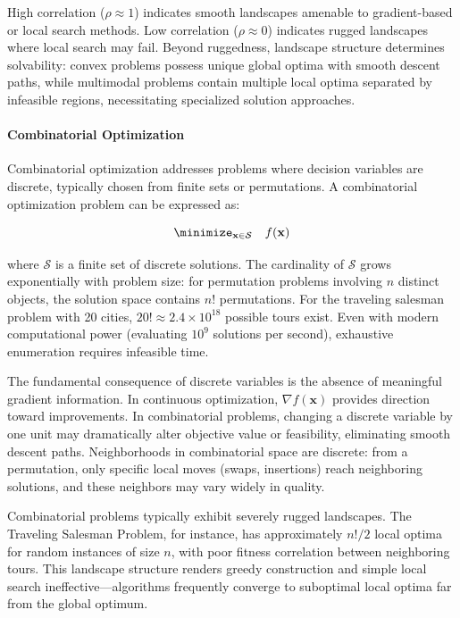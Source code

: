 High correlation ($\rho \approx 1$) indicates smooth landscapes amenable to gradient-based or local search methods. Low correlation ($\rho \approx 0$) indicates rugged landscapes where local search may fail. Beyond ruggedness, landscape structure determines solvability: convex problems possess unique global optima with smooth descent paths, while multimodal problems contain multiple local optima separated by infeasible regions, necessitating specialized solution approaches.

\paragraph{Combinatorial Optimization}

Combinatorial optimization addresses problems where decision variables are discrete, typically chosen from finite sets or permutations. A combinatorial optimization problem can be expressed as:

\begin{equation}
\minimize_{\mathbf{x} \in \mathcal{S}} \quad f(\mathbf{x})
\end{equation}

where $\mathcal{S}$ is a finite set of discrete solutions. The cardinality of $\mathcal{S}$ grows exponentially with problem size: for permutation problems involving $n$ distinct objects, the solution space contains $n!$ permutations. For the traveling salesman problem with 20 cities, $20! \approx 2.4 \times 10^{18}$ possible tours exist. Even with modern computational power (evaluating $10^9$ solutions per second), exhaustive enumeration requires infeasible time.

The fundamental consequence of discrete variables is the absence of meaningful gradient information. In continuous optimization, $\nabla f(\mathbf{x})$ provides direction toward improvements. In combinatorial problems, changing a discrete variable by one unit may dramatically alter objective value or feasibility, eliminating smooth descent paths. Neighborhoods in combinatorial space are discrete: from a permutation, only specific local moves (swaps, insertions) reach neighboring solutions, and these neighbors may vary widely in quality.

Combinatorial problems typically exhibit severely rugged landscapes. The Traveling Salesman Problem, for instance, has approximately $n!/2$ local optima for random instances of size $n$, with poor fitness correlation between neighboring tours. This landscape structure renders greedy construction and simple local search ineffective—algorithms frequently converge to suboptimal local optima far from the global optimum.

